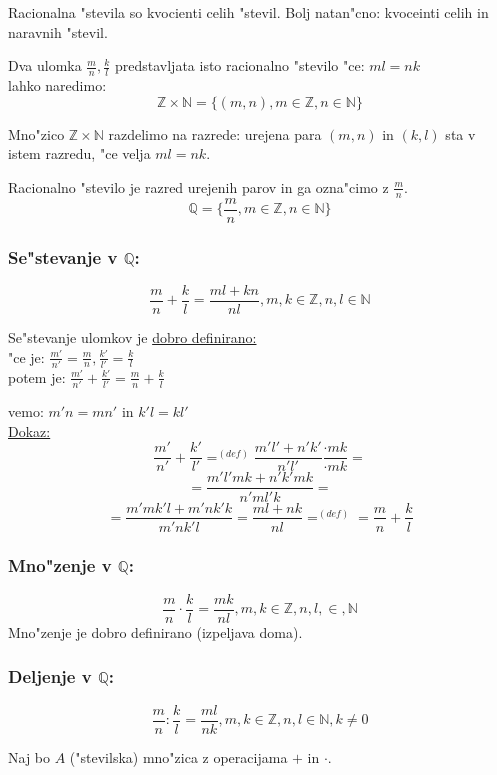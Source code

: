 Racionalna "stevila so kvocienti celih "stevil. Bolj natan"cno: kvoceinti celih in naravnih "stevil.

Dva ulomka \(\frac{m}{n}, \frac{k}{l} \) predstavljata isto racionalno "stevilo "ce: \(ml = nk \)\\
lahko naredimo:
\[\mathbb{Z} \times \mathbb{N} = \{(m, n), m \in \mathbb{Z}, n \in \mathbb{N} \}\]

Mno"zico \(\mathbb{Z} \times \mathbb{N} \) razdelimo na razrede: urejena para \((m, n)\) in \((k, l)\) sta v istem razredu, "ce velja \(ml = nk\).

Racionalno "stevilo je razred urejenih parov in ga ozna"cimo z \(\frac{m}{n}\).
\[\mathbb{Q} = \{\frac{m}{n}, m \in \mathbb{Z}, n \in \mathbb{N}\} \]

\subsubsection*{Se"stevanje v \(\mathbb{Q}\):}
\[\frac{m}{n} + \frac{k}{l} = \frac{ml + kn}{nl}, m, k \in \mathbb{Z}, n, l \in \mathbb{N} \]

Se"stevanje ulomkov je \underline{dobro definirano:}\\
"ce je: \(\frac{m'}{n'} = \frac{m}{n}, \frac{k'}{l'} = \frac{k}{l}\)\\
potem je: \(\frac{m'}{n'} + \frac{k'}{l'} = \frac{m}{n} + \frac{k}{l}\)

vemo: \(m'n = mn'\) in \(k'l = kl'\)\\
\underline{Dokaz:}
\[\frac{m'}{n'} + \frac{k'}{l'} =^{(def)} \frac{m'l' + n'k'}{n'l'} \frac{\cdot mk}{\cdot mk}=\]
\[= \frac{m'l'mk + n'k'mk}{n'ml'k} = \]
\[= \frac{m'mk'l + m'nk'k}{m'nk'l} = \frac{ml + nk}{nl} =^{(def)} = \frac{m}{n} + \frac{k}{l}\]

\subsubsection*{Mno"zenje v \(\mathbb{Q}\):}
\[\frac{m}{n} \cdot \frac{k}{l} = \frac{mk}{nl}, m, k \in \mathbb{Z}, n, l, \in, \mathbb{N}\]
Mno"zenje je dobro definirano (izpeljava doma).

\subsubsection*{Deljenje v \(\mathbb{Q}\):}
\[\frac{m}{n} : \frac{k}{l} = \frac{ml}{nk}, m, k \in \mathbb{Z}, n, l \in \mathbb{N}, k \neq 0 \]

Naj bo \(A\) ("stevilska) mno"zica z operacijama \(+\) in \(\cdot\).


